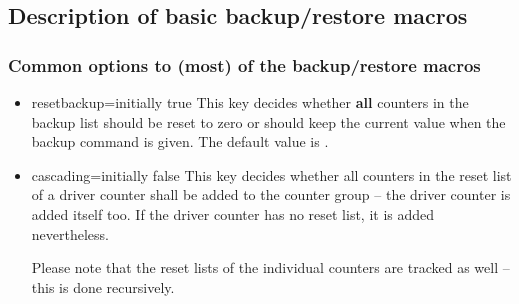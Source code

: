 \documentclass[12pt,a4paper,oneside]{article}
\begin{document}
\subsection{Description of basic backup/restore macros}

\subsubsection{Common options to (most) of the backup/restore macros} \label{subsubsec::common_options_backuprestore}

\begin{itemize}
\item 
  \begin{docKey}[][]{resetbackup}{=}{initially true}
    This key decides whether \textbf{all} counters in the backup list should be reset to zero or should keep the current value when the backup command is given. The default value is .
  \end{docKey}
\item \begin{docKey}[][]{cascading}{=}{initially false}
    This key decides whether all counters in the reset list of a driver counter shall be added to the counter group -- the driver counter is added itself too. If the driver counter has no reset list, it is added nevertheless. 
    
    Please note that the reset lists of the individual counters are tracked as well -- this is done recursively. 
    

\end{docKey}
\end{itemize}
\end{document}
